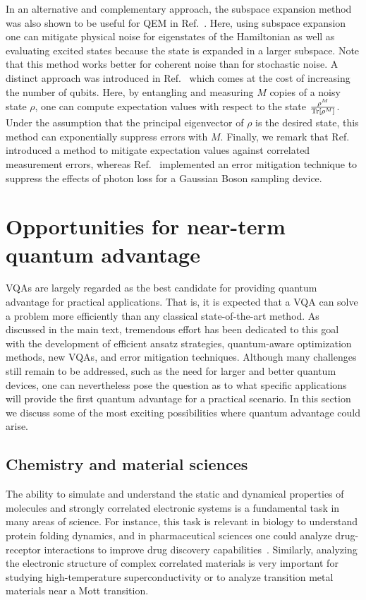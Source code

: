 \documentclass[prx,twocolumn,floatfix,superscriptaddress,longbibliography]{revtex4-1}
\newcommand{\<}{\langle}
\renewcommand{\>}{\rangle}
\newcommand{\Tr}{{\rm Tr}}
\begin{document}
In an alternative and complementary approach, the subspace expansion method was also shown to be useful for QEM in Ref.~\cite{mcclean2020decoding}. Here, using subspace expansion one can mitigate physical noise for eigenstates of the Hamiltonian as well as evaluating excited states because the state is expanded in a larger subspace. Note that this method works better for coherent noise than for stochastic noise. A distinct approach was introduced in Ref.~\cite{koczor2020exponential,huggins2020virtual} which comes at the cost of increasing the number of qubits. Here, by entangling and measuring $M$ copies of a noisy state $\rho$, one can compute expectation values with respect to the state $\frac{\rho^M}{\Tr[\rho^M]}$. Under the assumption that the principal eigenvector of $\rho$ is the desired state, this method can exponentially suppress errors with $M$. Finally, we remark that Ref.~\cite{bravyi2020mitigating} introduced a method to mitigate expectation values against correlated measurement errors, whereas Ref.~\cite{su2020error} implemented an error mitigation technique to suppress the effects  of photon loss for a Gaussian Boson sampling device. 
 

\section{Opportunities for near-term quantum advantage}\label{sec:5}

VQAs are largely regarded as the best candidate for providing quantum advantage for practical applications. That is, it is expected that a VQA can solve a problem more efficiently than any classical state-of-the-art method. As discussed in the main text, tremendous effort has been dedicated to this goal with the development of efficient ansatz strategies, quantum-aware optimization methods, new VQAs, and error mitigation techniques. Although many challenges still remain to be addressed, such as the need for larger and better quantum devices, one can nevertheless pose the question as to what specific applications will provide the first quantum advantage for a practical scenario. In this section we discuss some of the most exciting possibilities where quantum advantage could arise. 



\subsection{Chemistry and material sciences}
The ability to simulate and understand the static and dynamical properties of molecules and strongly correlated electronic systems is a fundamental task in many areas of science. For instance, this task is relevant in biology to understand protein folding dynamics, and in  pharmaceutical sciences one could analyze drug-receptor interactions to improve drug discovery capabilities~\cite{cao2018potential,cao2019quantum,outeiral2020prospects}. Similarly, analyzing the electronic structure of complex correlated materials is very important for studying high-temperature superconductivity or to analyze transition metal materials near a Mott transition. 
\end{document}
